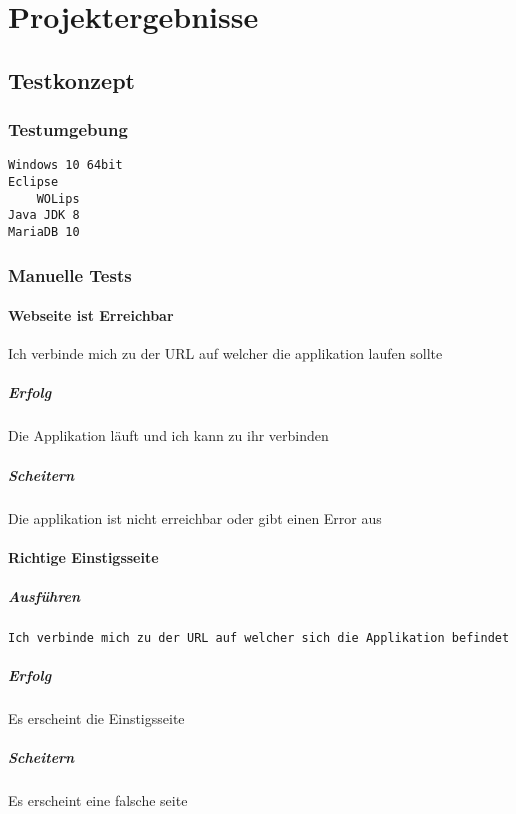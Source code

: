 \documentclass[a4paper, 11pt]{article}
\begin{document}
\section{Projektergebnisse}

\subsection{Testkonzept}

\subsubsection{Testumgebung}

\begin{verbatim}
Windows 10 64bit
Eclipse
    WOLips
Java JDK 8
MariaDB 10
\end{verbatim}

\subsubsection{Manuelle Tests}

\paragraph{Webseite ist Erreichbar}

Ich verbinde mich zu der URL auf welcher die applikation laufen sollte

\subparagraph{Erfolg}

Die Applikation läuft und ich kann zu ihr verbinden

\subparagraph{Scheitern}

Die applikation ist nicht erreichbar oder gibt einen Error aus

\paragraph{Richtige Einstigsseite}

\subparagraph{Ausführen}

\begin{verbatim}
Ich verbinde mich zu der URL auf welcher sich die Applikation befindet
\end{verbatim}

\subparagraph{Erfolg}

Es erscheint die Einstigsseite

\subparagraph{Scheitern}

Es erscheint eine falsche seite
\end{document}
